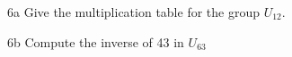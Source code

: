 
\begin{question}{6a}
Give the multiplication table for the group $U_{12}$.
\end{question}

\begin{question}{6b}
Compute the inverse of 43 in $U_{63}$
\end{question}




